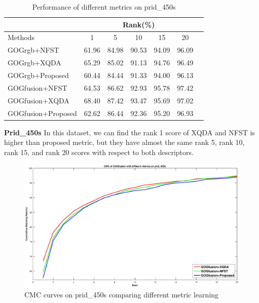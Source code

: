 \documentclass[conference,compsoc]{IEEEtran}
\begin{document}
\begin{table}[H]
\caption{Performance of different metrics on prid\_450s}
\centering
\begin{tabular}{|l|c|c|c|c|c|c|}
\hline
& \multicolumn{5}{|c|}{Rank(\%)} \\
\hline
Methods& 1 & 5 &10& 15&20\\
\hline
GOGrgb+NFST& 61.96&84.98 &90.53& 94.09&96.09 \\  %
\hline
GOGrgb+XQDA&65.29 &85.02 & 91.13&94.76& 96.49\\ 
\hline
GOGrgb+Proposed&60.44& 84.44&91.33&94.00&96.13\\  %
\hline
GOGfusion+NFST& 64.53&86.62 & 92.93&95.78&97.42 \\ 
\hline
GOGfusion+XQDA&68.40 & 87.42&93.47 &95.69& 97.02\\ 
\hline
GOGfusion+Proposed&62.62&86.44&92.36&95.20& 96.93\\ %

\hline

\end{tabular}
\end{table}
\textbf{Prid\_450s} In this dataset, we can find the rank 1 score of XQDA and NFST is higher than proposed metric, but they have almost the same rank 5, rank 10, rank 15, and rank 20 scores with respect to both descriptors. 

\begin{figure}
\begin{raggedleft}
\includegraphics[width=1\linewidth]{prid450s.eps}
\vspace{-3em}
\caption{CMC curves on prid\_450s comparing different metric learning}
\end{raggedleft}
\end{figure}
\end{document}
